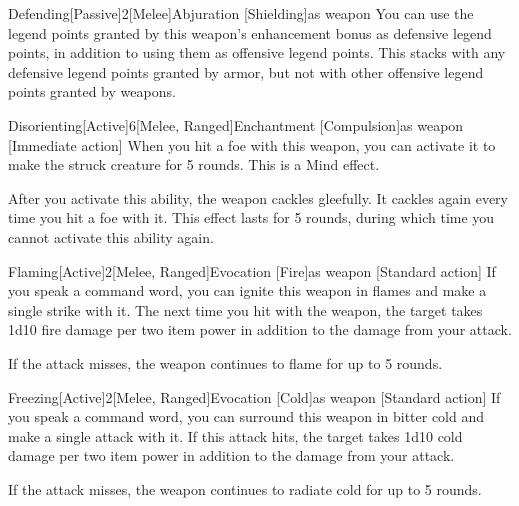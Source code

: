         \begin{magicitemdef}{Defending}[Passive]{2}[Melee]{Abjuration [Shielding]}{as weapon}
             You can use the legend points granted by this weapon's enhancement bonus as defensive legend points, in addition to using them as offensive legend points.
            This stacks with any defensive legend points granted by armor, but not with other offensive legend points granted by weapons.
        \end{magicitemdef}

        \begin{magicitemdef}{Disorienting}[Active]{6}[Melee, Ranged]{Enchantment [Compulsion]}{as weapon}
            [Immediate action] When you hit a foe with this weapon, you can activate it to make the struck creature \disoriented for 5 rounds.
            This is a Mind effect.

            After you activate this ability, the weapon cackles gleefully.
            It cackles again every time you hit a foe with it.
            This effect lasts for 5 rounds, during which time you cannot activate this ability again.
        \end{magicitemdef}

        \begin{magicitemdef}{Flaming}[Active]{2}[Melee, Ranged]{Evocation [Fire]}{as weapon}
            [Standard action] If you speak a command word, you can ignite this weapon in flames and make a single strike with it. The next time you hit with the weapon, the target takes 1d10 fire damage per two item power in addition to the damage from your attack.

            If the attack misses, the weapon continues to flame for up to 5 rounds.
        \end{magicitemdef}

        \begin{magicitemdef}{Freezing}[Active]{2}[Melee, Ranged]{Evocation [Cold]}{as weapon}
            [Standard action] If you speak a command word, you can surround this weapon in bitter cold and make a single attack with it. If this attack hits, the target takes 1d10 cold damage per two item power in addition to the damage from your attack.

            If the attack misses, the weapon continues to radiate cold for up to 5 rounds.
        \end{magicitemdef}

